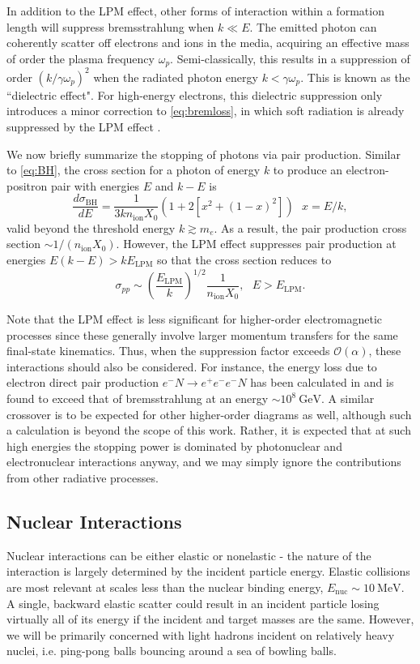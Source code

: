 \documentclass[twocolumn,showpacs,preprintnumbers,amsmath,amssymb,prd]{revtex4}
\newcommand{\OO}{\mathcal{O}}
\newcommand{\GeV}{\text{GeV}}
\def\r{\right)}
\def\l{\left(}
\begin{document}
\begin{appendices}
In addition to the LPM effect, other forms of interaction within a formation length will suppress bremsstrahlung when $k \ll E$.
The emitted photon can coherently scatter off electrons and ions in the media, acquiring an effective mass of order the plasma frequency $\omega_p$.
Semi-classically, this results in a suppression of order $(k/\gamma \omega_p)^2$ when the radiated photon energy $k < \gamma \omega_p$.
This is known as the ``dielectric effect".
For high-energy electrons, this dielectric suppression only introduces a minor correction to \eqref{eq:bremloss}, in which soft radiation is already suppressed by the LPM effect \cite{Klein:1998du}.

We now briefly summarize the stopping of photons via pair production. Similar to \eqref{eq:BH}, the cross section for a photon of energy $k$ to produce an electron-positron pair with energies $E$ and $k-E$ is
\begin{equation}
\label{eq:PP}
\frac{d \sigma_\text{BH}}{dE} = \frac{1}{3 k n_\text{ion} X_0} (1+ 2[x^2+ (1-x)^2]) ~~~ x = E/k,
\end{equation}
valid beyond the threshold energy $k \gtrsim m_e$. 
As a result, the pair production cross section $\sim 1/(n_\text{ion} X_0)$.
However, the LPM effect suppresses pair production at energies $E(k-E) > k E_\text{LPM}$ so that the cross section reduces to
\begin{equation}
\sigma_{pp} \sim \l\frac{E_\text{LPM}}{k} \r^{1/2} \frac{1}{n_\text{ion} X_0}, ~~~ E>E_\text{LPM}.
\end{equation}

Note that the LPM effect is less significant for higher-order electromagnetic processes since these generally involve larger momentum transfers for the same final-state kinematics.
Thus, when the suppression factor exceeds $\OO(\alpha)$, these interactions should also be considered.
For instance, the energy loss due to electron direct pair production $e^-N \to e^+ e^- e^- N$ has been calculated in \cite{Gerhardt:2010bj} and is found to exceed that of bremsstrahlung at an energy $\sim 10^{8} ~\GeV$. 
A similar crossover is to be expected for other higher-order diagrams as well, although such a calculation is beyond the scope of this work. 
Rather, it is expected that at such high energies the stopping power is dominated by photonuclear and electronuclear interactions anyway, and we may simply ignore the contributions from other radiative processes. 

\subsection*{Nuclear Interactions}
Nuclear interactions can be either elastic or nonelastic - the nature of the interaction is largely determined by the incident particle energy.
Elastic collisions are most relevant at scales less than the nuclear binding energy, $E_\text{nuc} \sim 10 ~\text{MeV}$.
A single, backward elastic scatter could result in an incident particle losing virtually all of its energy if the incident and target masses are the same.
However, we will be primarily concerned with light hadrons incident on relatively heavy nuclei, i.e.
ping-pong balls bouncing around a sea of bowling balls.


\end{appendices}
\end{document}
